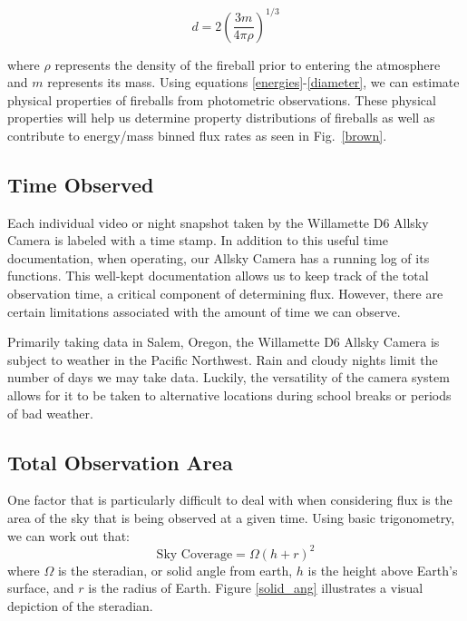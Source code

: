 \begin{equation}
d = 2(\frac{3m}{4\pi \rho})^{1/3}
\label{diameter}
\end{equation}

where $\rho$ represents the density of the fireball prior to entering the atmosphere and $m$ represents its mass. 
Using equations \ref{energies}-\ref{diameter}, we can estimate physical properties of fireballs from photometric observations.
These physical properties will help us determine property distributions of fireballs as well as contribute to energy/mass binned flux rates as seen in Fig.~\ref{brown}.



\subsection{Time Observed}

Each individual video or night snapshot taken by the Willamette D6 Allsky Camera is labeled with a time stamp.  
In addition to this useful time documentation, when operating, our Allsky Camera has a running log of its functions.
This well-kept documentation allows us to keep track of the total observation time, a critical component of determining flux.  
However, there are certain limitations associated with the amount of time we can observe.

Primarily taking data in Salem, Oregon, the Willamette D6 Allsky Camera is subject to weather in the Pacific Northwest.  
Rain and cloudy nights limit the number of days we may take data.
Luckily, the versatility of the camera system allows for it to be taken to alternative locations during school breaks or periods of bad weather.


\subsection{Total Observation Area}
One factor that is particularly difficult to deal with when considering flux is the area of the sky that is being observed at a given time.
Using basic trigonometry, we can work out that:
\begin{equation}
    \text{Sky Coverage} = \Omega(h+r)^2
    \label{area_eq}
\end{equation}
where $\Omega$ is the steradian, or solid angle from earth, $h$ is the height above Earth's surface, and $r$ is the radius of Earth.
Figure \ref{solid_ang} illustrates a visual depiction of the steradian.  


